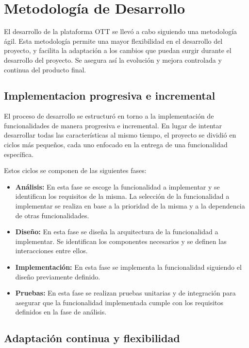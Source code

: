 \section{Metodología de Desarrollo}
\label{sec:metodologia_desarrollo}

El desarrollo de la plataforma OTT se llevó a cabo siguiendo una metodología ágil. Esta metodología
permite una mayor flexibilidad en el desarrollo del proyecto, y facilita la adaptación a los cambios
que puedan surgir durante el desarrollo del proyecto. Se asegura así la evolución y mejora controlada
y continua del producto final.

\subsection{Implementacion progresiva e incremental}
\label{subsec:implementacion_progresiva}

El proceso de desarrollo se estructuró en torno a la implementación de funcionalidades de manera 
progresiva e incremental. En lugar de intentar desarrollar todas las características al mismo tiempo, 
el proyecto se dividió en ciclos más pequeños, cada uno enfocado en la entrega de una funcionalidad específica.

Estos ciclos se componen de las siguientes fases:
\begin{itemize}
    \item \textbf{Análisis:} En esta fase se escoge la funcionalidad a implementar y se identifican los 
    requisitos de la misma. La selección de la funcionalidad a implementar se realiza en base a la
    prioridad de la misma y a la dependencia de otras funcionalidades.
    \item \textbf{Diseño:} En esta fase se diseña la arquitectura de la funcionalidad a implementar. Se
    identifican los componentes necesarios y se definen las interacciones entre ellos.
    \item \textbf{Implementación:} En esta fase se implementa la funcionalidad siguiendo el diseño
    previamente definido.
    \item \textbf{Pruebas:} En esta fase se realizan pruebas unitarias y de integración para asegurar
    que la funcionalidad implementada cumple con los requisitos definidos en la fase de análisis.
\end{itemize}

\subsection{Adaptación continua y flexibilidad}
\label{subsec:adaptacion_continua}

